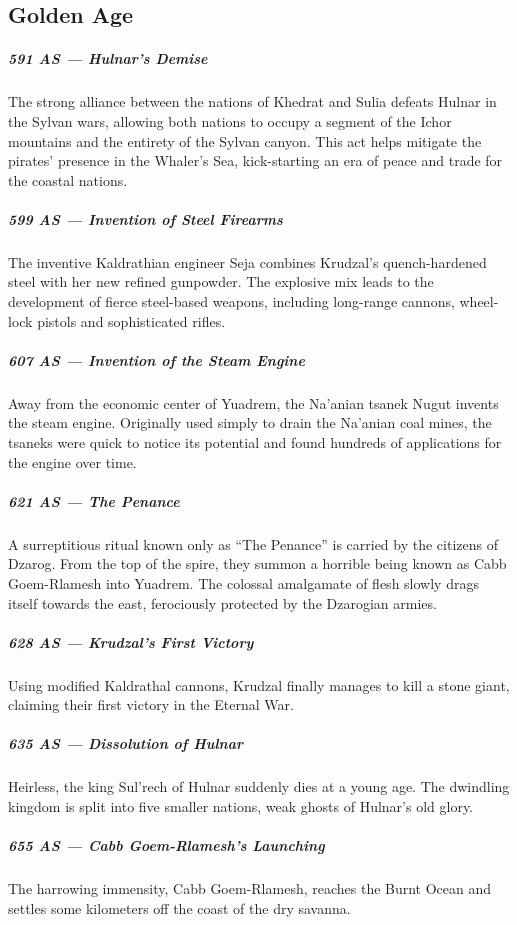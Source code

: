 \begin{linenumbers}
\subsection*{Golden Age}
\subparagraph{591 AS --- Hulnar's Demise} The strong alliance between the nations of Khedrat and Sulia defeats Hulnar in the Sylvan wars, allowing both nations to occupy a segment of the Ichor mountains and the entirety of the Sylvan canyon.
This act helps mitigate the pirates' presence in the Whaler's Sea, kick-starting an era of peace and trade for the coastal nations.

\subparagraph{599 AS --- Invention of Steel Firearms} The inventive Kaldrathian engineer Seja combines Krudzal's quench-hardened steel with her new refined gunpowder.
The explosive mix leads to the development of fierce steel-based weapons, including long-range cannons, wheel-lock pistols and sophisticated rifles.

\subparagraph{607 AS --- Invention of the Steam Engine} Away from the economic center of Yuadrem, the Na'anian tsanek Nugut invents the steam engine.
Originally used simply to drain the Na'anian coal mines, the tsaneks were quick to notice its potential and found hundreds of applications for the engine over time.

\subparagraph{621 AS --- The Penance} A surreptitious ritual known only as ``The Penance'' is carried by the citizens of Dzarog.
From the top of the spire, they summon a horrible being known as Cabb Goem-Rlamesh into Yuadrem.
The colossal amalgamate of flesh slowly drags itself towards the east, ferociously protected by the Dzarogian armies.

\subparagraph{628 AS --- Krudzal's First Victory} Using modified Kaldrathal cannons, Krudzal finally manages to kill a stone giant, claiming their first victory in the Eternal War.

\subparagraph{635 AS --- Dissolution of Hulnar} Heirless, the king Sul'rech of Hulnar suddenly dies at a young age.
The dwindling kingdom is split into five smaller nations, weak ghosts of Hulnar's old glory.

\subparagraph{655 AS --- Cabb Goem-Rlamesh's Launching} The harrowing immensity, Cabb Goem-Rlamesh, reaches the Burnt Ocean and settles some kilometers off the coast of the dry savanna.


\end{linenumbers}
